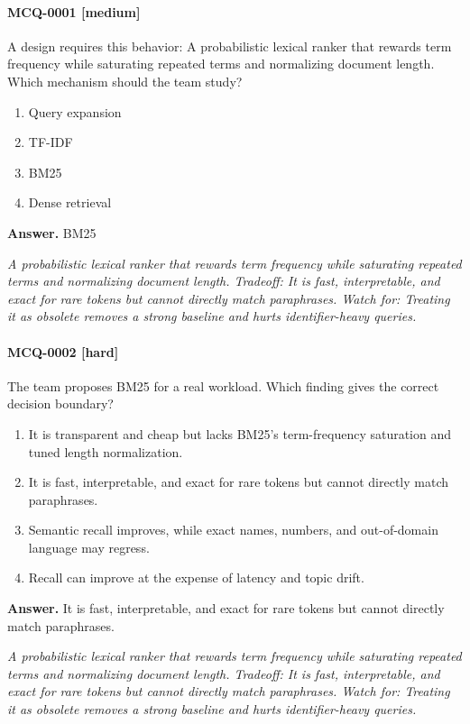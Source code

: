 \paragraph{MCQ-0001 [medium]} A design requires this behavior: A probabilistic lexical ranker that rewards term frequency while saturating repeated terms and normalizing document length. Which mechanism should the team study?
\begin{enumerate}[label=\Alph*.]
\item Query expansion
\item TF-IDF
\item BM25
\item Dense retrieval
\end{enumerate}
\noindent\textbf{Answer.} BM25
\par\textit{A probabilistic lexical ranker that rewards term frequency while saturating repeated terms and normalizing document length. Tradeoff: It is fast, interpretable, and exact for rare tokens but cannot directly match paraphrases. Watch for: Treating it as obsolete removes a strong baseline and hurts identifier-heavy queries.}
\paragraph{MCQ-0002 [hard]} The team proposes BM25 for a real workload. Which finding gives the correct decision boundary?
\begin{enumerate}[label=\Alph*.]
\item It is transparent and cheap but lacks BM25's term-frequency saturation and tuned length normalization.
\item It is fast, interpretable, and exact for rare tokens but cannot directly match paraphrases.
\item Semantic recall improves, while exact names, numbers, and out-of-domain language may regress.
\item Recall can improve at the expense of latency and topic drift.
\end{enumerate}
\noindent\textbf{Answer.} It is fast, interpretable, and exact for rare tokens but cannot directly match paraphrases.
\par\textit{A probabilistic lexical ranker that rewards term frequency while saturating repeated terms and normalizing document length. Tradeoff: It is fast, interpretable, and exact for rare tokens but cannot directly match paraphrases. Watch for: Treating it as obsolete removes a strong baseline and hurts identifier-heavy queries.}
